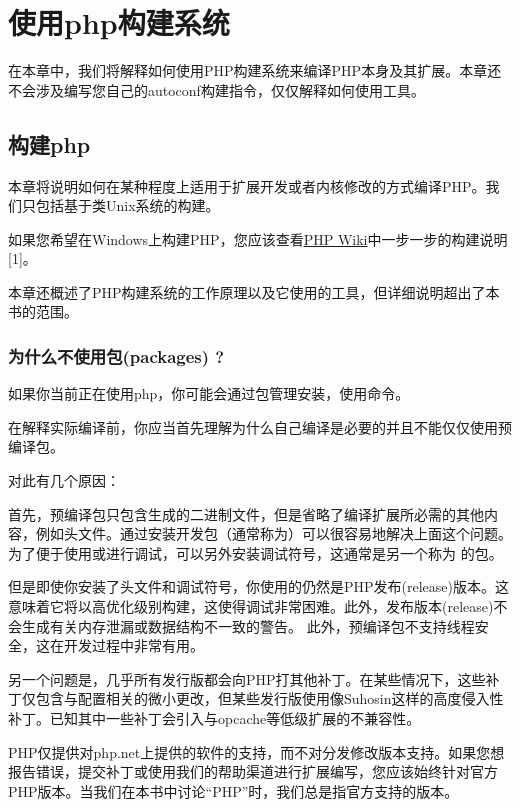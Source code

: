 \chapter{使用php构建系统}

在本章中，我们将解释如何使用PHP构建系统来编译PHP本身及其扩展。本章还不会涉及编写您自己的autoconf构建指令，仅仅解释如何使用工具。

\section{构建php}

本章将说明如何在某种程度上适用于扩展开发或者内核修改的方式编译PHP。我们只包括基于类Unix系统的构建。

如果您希望在Windows上构建PHP，您应该查看\href{https://wiki.php.net/internals/windows/stepbystepbuild}{PHP Wiki}中一步一步的构建说明[1]。

本章还概述了PHP构建系统的工作原理以及它使用的工具，但详细说明超出了本书的范围。


\subsection{为什么不使用包(packages) ?}

如果你当前正在使用php，你可能会通过包管理安装，使用命令。

在解释实际编译前，你应当首先理解为什么自己编译是必要的并且不能仅仅使用预编译包。

对此有几个原因：

首先，预编译包只包含生成的二进制文件，但是省略了编译扩展所必需的其他内容，例如头文件。通过安装开发包（通常称为）可以很容易地解决上面这个问题。为了便于使用或进行调试，可以另外安装调试符号，这通常是另一个称为 的包。

但是即使你安装了头文件和调试符号，你使用的仍然是PHP发布(release)版本。这意味着它将以高优化级别构建，这使得调试非常困难。此外，发布版本(release)不会生成有关内存泄漏或数据结构不一致的警告。 此外，预编译包不支持线程安全，这在开发过程中非常有用。

另一个问题是，几乎所有发行版都会向PHP打其他补丁。在某些情况下，这些补丁仅包含与配置相关的微小更改，但某些发行版使用像Suhosin这样的高度侵入性补丁。已知其中一些补丁会引入与opcache等低级扩展的不兼容性。

PHP仅提供对php.net上提供的软件的支持，而不对分发修改版本支持。如果您想报告错误，提交补丁或使用我们的帮助渠道进行扩展编写，您应该始终针对官方PHP版本。当我们在本书中讨论“PHP”时，我们总是指官方支持的版本。

